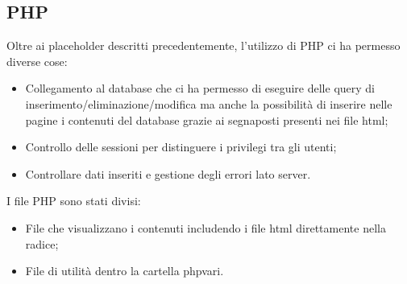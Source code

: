 \subsection{PHP}

Oltre ai placeholder descritti precedentemente, l'utilizzo di PHP ci ha permesso diverse cose:
\begin{itemize}
    \item Collegamento al database che ci ha permesso di eseguire delle query di inserimento/eliminazione/modifica ma anche la possibilità
        di inserire nelle pagine i contenuti del database grazie ai segnaposti presenti nei file html;
    \item Controllo delle sessioni per distinguere i privilegi tra gli utenti;
    \item Controllare dati inseriti e gestione degli errori lato server.
\end{itemize}

I file PHP sono stati divisi:
\begin{itemize}
    \item File che visualizzano i contenuti includendo i file html direttamente nella radice;
    \item File di utilità dentro la cartella php\textunderscore vari.
\end{itemize}
